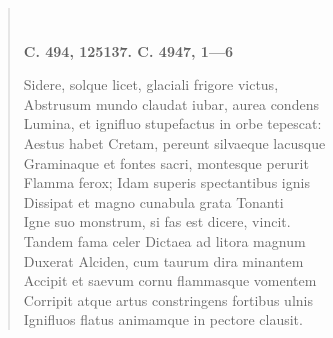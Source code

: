 \documentclass[11pt, a4paper]{report}
\begin{document}
\begin{verse}
        ﻿\pagebreak 
    \begin{center} \textbf{C. 494, 125137. C. 4947, 1—6} \end{center} \marginpar{[57]} Sidere, solque licet, glaciali frigore victus, \\ Abstrusum mundo claudat iubar, aurea condens \\ Lumina, et ignifluo stupefactus in orbe tepescat: \\ Aestus habet Cretam, pereunt silvaeque lacusque \\ Graminaque et fontes sacri, montesque perurit \\ Flamma ferox; Idam superis spectantibus ignis \\ Dissipat et magno cunabula grata Tonanti \\ Igne suo monstrum, si fas est dicere, vincit. \\ Tandem fama celer Dictaea ad litora magnum \\ Duxerat Alciden, cum taurum dira minantem \\ Accipit et saevum cornu flammasque vomentem \\ Corripit atque artus constringens fortibus ulnis \\ Ignifluos flatus animamque in pectore clausit. \\ 
      \end{verse}
  
\end{document}
